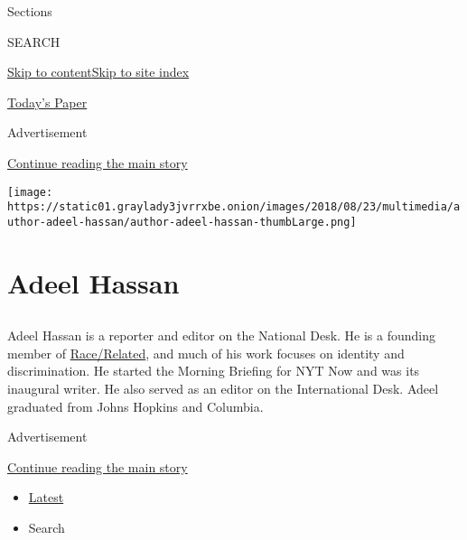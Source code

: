 Sections

SEARCH

\protect\hyperlink{site-content}{Skip to
content}\protect\hyperlink{site-index}{Skip to site index}

\href{https://myaccount.nytimes3xbfgragh.onion/auth/login?response_type=cookie\&client_id=vi}{}

\href{https://www.nytimes3xbfgragh.onion/section/todayspaper}{Today's
Paper}

Advertisement

\protect\hyperlink{after-top}{Continue reading the main story}

\texttt{[image: https://static01.graylady3jvrrxbe.onion/images/2018/08/23/multimedia/author-adeel-hassan/author-adeel-hassan-thumbLarge.png]}

\hypertarget{adeel-hassan}{%
\section{Adeel Hassan}\label{adeel-hassan}}

\hypertarget{section}{%
\subsection{}\label{section}}

Adeel Hassan is a reporter and editor on the National Desk. He is a
founding member of
\href{https://www.nytimes3xbfgragh.onion/spotlight/race}{Race/Related},
and much of his work focuses on identity and discrimination. He started
the Morning Briefing for NYT Now and was its inaugural writer. He also
served as an editor on the International Desk. Adeel graduated from
Johns Hopkins and Columbia.

Advertisement

\protect\hyperlink{after-mid1}{Continue reading the main story}

\begin{itemize}
\tightlist
\item
  \protect\hyperlink{stream-panel}{Latest}
\item
  Search
\end{itemize}

